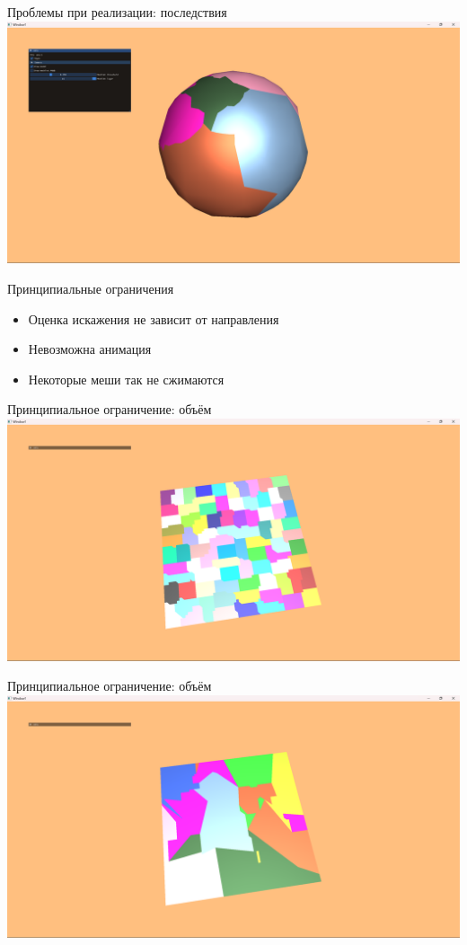 \documentclass{beamer}
\begin{document}
    \begin{frame}{Проблемы при реализации: последствия}
        \includegraphics[width=\textwidth]{sphere1.png}
    \end{frame}

    \begin{frame}{Принципиальные ограничения}
        \begin{itemize}
            \item Оценка искажения не зависит от направления
            \item Невозможна анимация
            \item Некоторые меши так не сжимаются
        \end{itemize}
    \end{frame}

    \begin{frame}{Принципиальное ограничение: объём}
        \includegraphics[width=\textwidth]{plane0.png}
    \end{frame}

    \begin{frame}{Принципиальное ограничение: объём}
        \includegraphics[width=\textwidth]{plane1.png}
    \end{frame}
\end{document}
